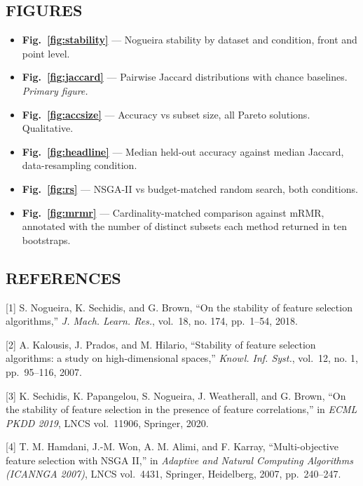 \documentclass[conference]{IEEEtran}
\providecommand{\tightlist}{\setlength{\itemsep}{0pt}\setlength{\parskip}{0pt}}
\begin{document}
\subsection{FIGURES}

\begin{itemize}
\tightlist
\item
  \textbf{Fig.~\ref{fig:stability}} --- Nogueira stability by dataset and condition, front and point level.
\item
  \textbf{Fig.~\ref{fig:jaccard}} --- Pairwise Jaccard distributions with chance baselines. \emph{Primary figure.}
\item
  \textbf{Fig.~\ref{fig:accsize}} --- Accuracy vs subset size, all Pareto solutions. Qualitative.
\item
  \textbf{Fig.~\ref{fig:headline}} --- Median held-out accuracy against median Jaccard, data-resampling condition.
\item
  \textbf{Fig.~\ref{fig:rs}} --- NSGA-II vs budget-matched random search, both conditions.
\item
  \textbf{Fig.~\ref{fig:mrmr}} --- Cardinality-matched comparison against mRMR, annotated with the number of distinct subsets each method returned in ten bootstraps.
\end{itemize}



\subsection{REFERENCES}



[1] S. Nogueira, K. Sechidis, and G. Brown, ``On the stability of feature selection algorithms,'' \emph{J. Mach. Learn. Res.}, vol.~18, no. 174, pp.~1--54, 2018. 

[2] A. Kalousis, J. Prados, and M. Hilario, ``Stability of feature selection algorithms: a study on high-dimensional spaces,'' \emph{Knowl. Inf. Syst.}, vol.~12, no. 1, pp.~95--116, 2007. 

[3] K. Sechidis, K. Papangelou, S. Nogueira, J. Weatherall, and G. Brown, ``On the stability of feature selection in the presence of feature correlations,'' in \emph{ECML PKDD 2019}, LNCS vol.~11906, Springer, 2020. 

[4] T. M. Hamdani, J.-M. Won, A. M. Alimi, and F. Karray, ``Multi-objective feature selection with NSGA II,'' in \emph{Adaptive and Natural Computing Algorithms (ICANNGA 2007)}, LNCS vol.~4431, Springer, Heidelberg, 2007, pp.~240--247. 
\end{document}

